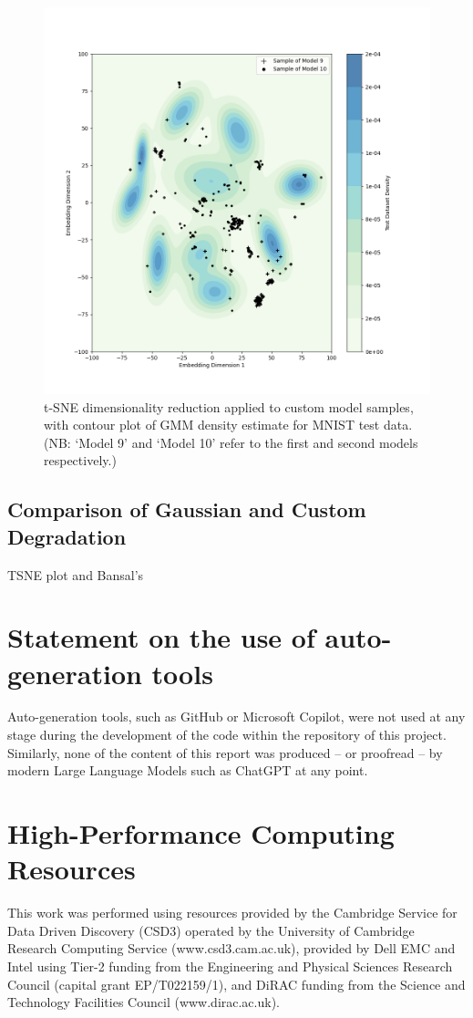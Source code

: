 \documentclass[12pt]{article}
\begin{document}
\begin{figure}[hp]
    \includegraphics[scale=0.54, center]{figures/tsne_custom_models.png}
    \caption{t-SNE dimensionality reduction applied to custom model samples, with contour plot of GMM density estimate for MNIST test data. (NB: `Model 9' and `Model 10' refer to the first and second models respectively.)}
    \label{fig:tsne_custom}
\end{figure}

\subsection{Comparison of Gaussian and Custom Degradation}
TSNE plot and Bansal's



\appendix

\section{Statement on the use of auto-generation tools}

Auto-generation tools, such as GitHub or Microsoft Copilot, were not used at any stage during the development of the code within the repository of this project.
Similarly, none of the content of this report was produced -- or proofread -- by modern Large Language Models such as ChatGPT at any point.

\section {High-Performance Computing Resources}

This work was performed using resources provided by the Cambridge Service for Data Driven Discovery (CSD3) operated by the University of Cambridge Research Computing Service (www.csd3.cam.ac.uk),
provided by Dell EMC and Intel using Tier-2 funding from the Engineering and Physical Sciences Research Council (capital grant EP/T022159/1),
and DiRAC funding from the Science and Technology Facilities Council (www.dirac.ac.uk).
\end{document}
